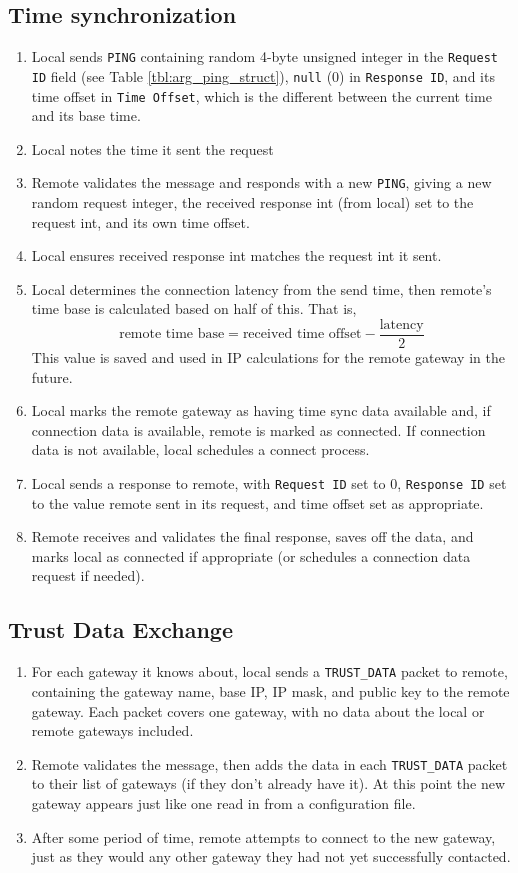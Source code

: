 \subsection{Time synchronization}
\label{sec:arg_time_sync}
\begin{enumerate}
	\item Local sends \texttt{PING} containing random 4-byte unsigned integer in the \texttt{Request ID} field (see Table \ref{tbl:arg_ping_struct}), \texttt{null} (0) in \texttt{Response ID}, and its time offset in \texttt{Time Offset}, which is the different between the current time and its base time. 
	\item Local notes the time it sent the request
	\item Remote validates the message and responds with a new \texttt{PING}, giving a new random request integer, the received response int (from local) set to the request int, and its own time offset.
	\item Local ensures received response int matches the request int it sent.
	\item Local determines the connection latency from the send time, then remote's time base is calculated based on half of this. That is,
	$$\text{remote time base} = \text{received time offset} - \frac{\text{latency}}{2}$$
	This value is saved and used in \ac{IP} calculations for the remote gateway in the future.

	\item Local marks the remote gateway as having time sync data available and, if connection data is available, remote is marked as connected. If connection data is not available, local schedules a connect process.
	\item Local sends a response to remote, with \texttt{Request ID} set to 0, \texttt{Response ID} set to the value remote sent in its request, and time offset set as appropriate.
	\item Remote receives and validates the final response, saves off the data, and marks local as connected if appropriate (or schedules a connection data request if needed).
\end{enumerate}

\subsection{Trust Data Exchange}
\begin{enumerate}
	\item For each gateway it knows about, local sends a \texttt{TRUST\_DATA} packet to remote, containing the gateway name, base \ac{IP}, \ac{IP} mask, and public key to the remote gateway. Each packet covers one gateway, with no data about the local or remote gateways included.
	\item Remote validates the message, then adds the data in each \texttt{TRUST\_DATA} packet to their list of gateways (if they don't already have it). At this point the new gateway appears just like one read in from a configuration file.
	\item After some period of time, remote attempts to connect to the new gateway, just as they would any other gateway they had not yet successfully contacted.
 \end{enumerate}

